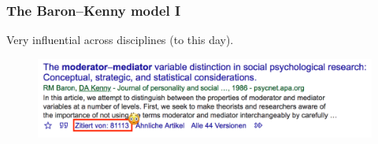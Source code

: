 \documentclass[11pt,english,dvipsnames,aspectratio=169,handout]{beamer}\usepackage[]{graphicx}\usepackage[]{xcolor}
\begin{document}
\begin{frame}
\frametitle{The Baron--Kenny model I}
Very influential across disciplines (to this day).

\begin{figure}
\begin{center}
    \includegraphics[scale=0.4]{../04-figures/11/01.PNG}
\end{center}
\label{fig:02}
\end{figure}

\begin{figure}
\end{figure}

\end{frame}
\end{document}

